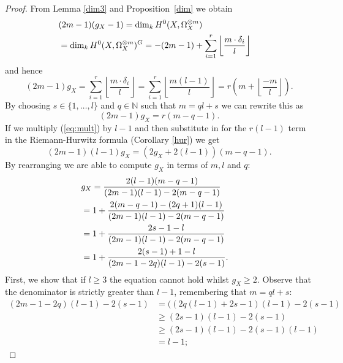 \begin{proof}
    
    From Lemma \ref{dim3} and Proposition~\ref{dim} we obtain
        \begin{align*}
        \lefteqn{(2m-1)(g_X-1)=\dim_kH^0(X,\Omega_X^{\otimes m})} \\
        & =  \dim_kH^0(X,\Omega_X^{\otimes m})^G=-(2m-1)+\sum_{i=1}^r \left\lfloor \frac{m\cdot \delta_i}{l} \right\rfloor
        \end{align*}
    and hence
        \begin{equation*}
        (2m-1)g_X = \sum_{i=1}^r \left\lfloor \frac{m\cdot \delta_i}{l} \right\rfloor
        = \sum_{i=1}^r \left\lfloor \frac{m(l-1)}{l} \right\rfloor
        = r\left( m+\left\lfloor \frac{-m}{l} \right\rfloor \right).
        \end{equation*}
    By choosing $s\in \{1,\ldots ,l\}$ and $q\in \mathbb{N}$ such that $m=ql+s$ we can rewrite this as
        \begin{equation}\label{eq:mult}
        (2m-1)g_X=r(m-q-1).
        \end{equation}
    If we multiply (\ref{eq:mult}) by $l-1$ and then substitute in for the $r(l-1)$ term in the Riemann-Hurwitz formula (Corollary \ref{hur}) we get
        \begin{equation*}
        (2m-1)(l-1)g_X=(2g_X+2(l-1))(m-q-1).
        \end{equation*}
    By rearranging we are able to compute $g_X$ in terms of $m,l$ and $q$:
        \begin{align}\label{equationgxintermsofmandlandq}
        \lefteqn{g_X = \frac{2(l-1)(m-q-1)}{(2m-1)(l-1)-2(m-q-1)}} \nonumber \\
        & =  1 + \frac{2(m-q-1)-(2q+1)(l-1)}{(2m-1)(l-1)-2(m-q-1)}  \nonumber\\
        & =  1 + \frac{2s-1-l}{(2m-1)(l-1)-2(m-q-1)} \nonumber  \\
        & =  1 + \frac{2(s-1)+1-l}{(2m-1-2q)(l-1)-2(s-1)}. 
        \end{align}
    First, we show that if $l\geq 3$ the equation cannot hold whilst $g_X\geq 2$.
    Observe that the denominator is strictly greater than $l-1$, remembering that $m=ql+s$:
        \begin{align*}
        (2m-1-2q)(l-1)-2(s-1) & =  ((2q(l-1)+2s-1)(l-1)-2(s-1) \\
        & \geq  (2s-1)(l-1)-2(s-1) \\
        & \geq  (2s-1)(l-1)-2(s-1)(l-1) \\
        & =  l-1;
        \end{align*}

\end{proof}
